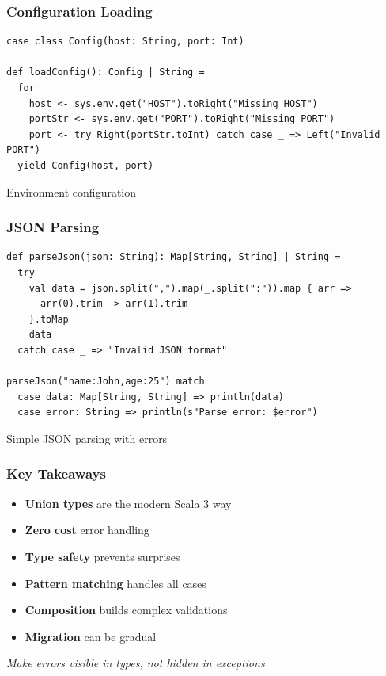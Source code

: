 \documentclass{beamer}
\begin{document}
\begin{frame}[fragile]
\frametitle{Configuration Loading}

\begin{lstlisting}[style=scalaStyle]
case class Config(host: String, port: Int)

def loadConfig(): Config | String =
  for
    host <- sys.env.get("HOST").toRight("Missing HOST")
    portStr <- sys.env.get("PORT").toRight("Missing PORT")  
    port <- try Right(portStr.toInt) catch case _ => Left("Invalid PORT")
  yield Config(host, port)
\end{lstlisting}

Environment configuration

\end{frame}

\begin{frame}[fragile]
\frametitle{JSON Parsing}

\begin{lstlisting}[style=scalaStyle]
def parseJson(json: String): Map[String, String] | String =
  try 
    val data = json.split(",").map(_.split(":")).map { arr =>
      arr(0).trim -> arr(1).trim
    }.toMap
    data
  catch case _ => "Invalid JSON format"

parseJson("name:John,age:25") match
  case data: Map[String, String] => println(data)
  case error: String => println(s"Parse error: $error")
\end{lstlisting}

Simple JSON parsing with errors

\end{frame}

\begin{frame}[fragile]
\frametitle{Key Takeaways}

\begin{itemize}
\item \textbf{Union types} are the modern Scala 3 way
\item \textbf{Zero cost} error handling
\item \textbf{Type safety} prevents surprises
\item \textbf{Pattern matching} handles all cases
\item \textbf{Composition} builds complex validations
\item \textbf{Migration} can be gradual
\end{itemize}

\vspace{1em}
\textit{Make errors visible in types, not hidden in exceptions}

\end{frame}
\end{document}
